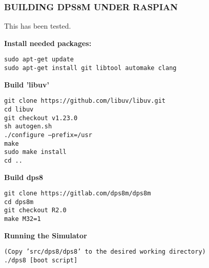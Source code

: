 \newpage

\subsubsection[Building dps8m under Raspbian]{BUILDING DPS8M UNDER RASPIAN}

This has been tested.

\textbf{Install needed packages:}

\begin{adjustwidth}{5ex}{1ex}
	\texttt{sudo apt-get update} \\
    \texttt{sudo apt-get install git libtool automake clang}
\end{adjustwidth}  

\textbf{Build 'libuv'}

\begin{adjustwidth}{5ex}{1ex}
    \texttt{git clone https://github.com/libuv/libuv.git} \\
    \texttt{cd libuv} \\
    \texttt{git checkout v1.23.0} \\
    \texttt{sh autogen.sh} \\
    \texttt{./configure --prefix=/usr} \\
    \texttt{make} \\
    \texttt{sudo make install} \\
    \texttt{cd ..} \\
\end{adjustwidth}  

\textbf{Build dps8}

\begin{adjustwidth}{5ex}{1ex}
    \texttt{git clone https://gitlab.com/dps8m/dps8m} \\
    \texttt{cd dps8m} \\
    \texttt{git checkout R2.0} \\
    \texttt{make M32=1} \\
\end{adjustwidth}  

\textbf{Running the Simulator}

\begin{adjustwidth}{5ex}{1ex}
    \texttt{(Copy 'src/dps8/dps8' to the desired working directory)} \\
    \texttt{./dps8 [boot script]} \\
\end{adjustwidth}  

